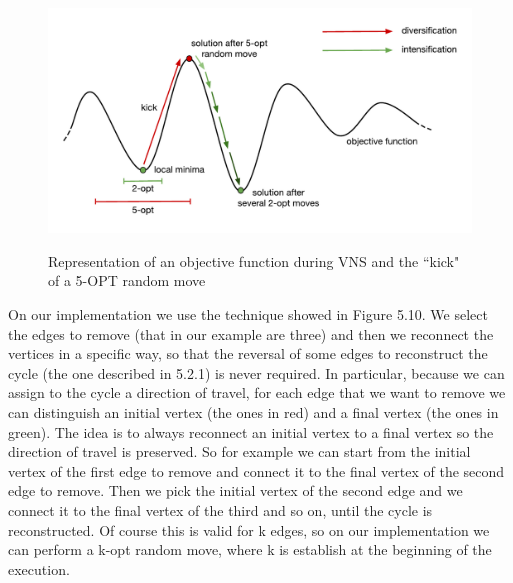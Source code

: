 \begin{figure}[h!]
\centering
	\includegraphics[scale=0.77]{media/vns_graph.pdf} \\
	\caption{Representation of an objective function during VNS and the ``kick" of a 5-OPT random move}
\end{figure}

\noindent On our implementation we use the technique showed in Figure 5.10. We select the edges to remove (that in our example are three) and then we reconnect the vertices in a specific way, so that the reversal of some edges to reconstruct the cycle (the one described in 5.2.1) is never required. In particular, because we can assign to the cycle a direction of travel, for each edge that we want to remove we can distinguish an initial vertex (the ones in red) and a final vertex (the ones in green). The idea is to always reconnect an initial vertex to a final vertex so the direction of travel is preserved. So for example we can start from the initial vertex of the first edge to remove and connect it to the final vertex of the second edge to remove. Then we pick the initial vertex of the second edge and we connect it to the final vertex of the third and so on, until the cycle is reconstructed. Of course this is valid for k edges, so on our implementation we can perform a k-opt random move, where k is establish at the beginning of the execution.

